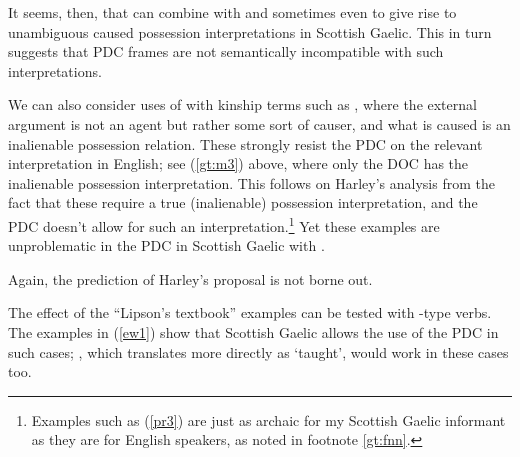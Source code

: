 \documentclass[output=paper,colorlinks,citecolor=brown]{langscibook}
\begin{document}


\noindent It seems, then, that  can combine with  and sometimes even  to give rise to unambiguous caused possession interpretations in Scottish Gaelic. This in turn suggests that PDC frames are not semantically incompatible with such interpretations. 

We can also consider uses of  with kinship terms such as , where the external argument is not an agent but rather some sort of causer, and what is caused is an inalienable possession relation. These strongly resist the PDC on the relevant interpretation in English; see (\ref{gt:m3}) above, where only the DOC has the inalienable possession interpretation. This follows on Harley's analysis from the fact that these require a true (inalienable) possession interpretation, and the PDC doesn't allow for such an interpretation.\footnote{Examples such as (\ref{pr3}) are just as archaic for my Scottish Gaelic informant as they are for English speakers, as noted in footnote \ref{gt:fnn}.} Yet these examples are unproblematic in the PDC in Scottish Gaelic with . 


\noindent Again, the prediction of Harley's proposal is not borne out. 

The effect of the ``Lipson's textbook'' examples can be tested with -type verbs. The examples in (\ref{ew1}) show that Scottish Gaelic allows the use of the PDC in such cases; , which translates more directly as `taught', would work in these cases too.

\end{document}
